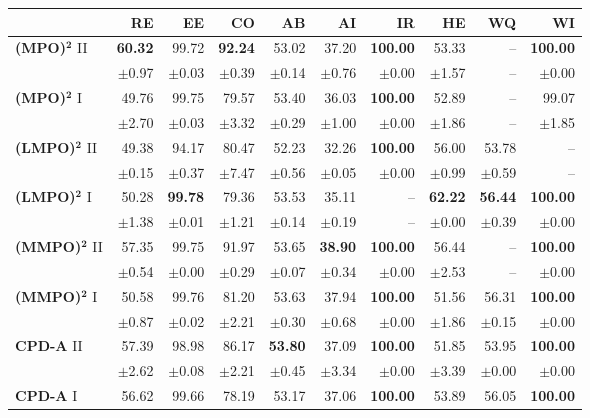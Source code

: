 \begin{table}[!htbp]
\centering
\scriptsize
\begin{tabular}{lrrrrr||rrrr}
\toprule
 & RE & EE & CO & AB & AI & IR & HE & WQ & WI \\
\midrule
\textbf{(MPO)}$\bm{^2}$ II & \textbf{60.32} & 99.72 & \textbf{92.24} & 53.02 & 37.20 & \textbf{100.00} & 53.33 & -- & \textbf{100.00} \\
 & $\pm$0.97 & $\pm$0.03 & $\pm$0.39 & $\pm$0.14 & $\pm$0.76 & $\pm$0.00 & $\pm$1.57 & -- & $\pm$0.00 \\
\midrule
\textbf{(MPO)}$\bm{^2}$ I & 49.76 & 99.75 & 79.57 & 53.40 & 36.03 & \textbf{100.00} & 52.89 & -- & 99.07 \\
 & $\pm$2.70 & $\pm$0.03 & $\pm$3.32 & $\pm$0.29 & $\pm$1.00 & $\pm$0.00 & $\pm$1.86 & -- & $\pm$1.85 \\
\midrule
\textbf{(LMPO)}$\bm{^2}$ II & 49.38 & 94.17 & 80.47 & 52.23 & 32.26 & \textbf{100.00} & 56.00 & 53.78 & -- \\
 & $\pm$0.15 & $\pm$0.37 & $\pm$7.47 & $\pm$0.56 & $\pm$0.05 & $\pm$0.00 & $\pm$0.99 & $\pm$0.59 & -- \\
\midrule
\textbf{(LMPO)}$\bm{^2}$ I & 50.28 & \textbf{99.78} & 79.36 & 53.53 & 35.11 & -- & \textbf{62.22} & \textbf{56.44} & \textbf{100.00} \\
 & $\pm$1.38 & $\pm$0.01 & $\pm$1.21 & $\pm$0.14 & $\pm$0.19 & -- & $\pm$0.00 & $\pm$0.39 & $\pm$0.00 \\
\midrule
\textbf{(MMPO)}$\bm{^2}$ II & 57.35 & 99.75 & 91.97 & 53.65 & \textbf{38.90} & \textbf{100.00} & 56.44 & -- & \textbf{100.00} \\
 & $\pm$0.54 & $\pm$0.00 & $\pm$0.29 & $\pm$0.07 & $\pm$0.34 & $\pm$0.00 & $\pm$2.53 & -- & $\pm$0.00 \\
\midrule
\textbf{(MMPO)}$\bm{^2}$ I & 50.58 & 99.76 & 81.20 & 53.63 & 37.94 & \textbf{100.00} & 51.56 & 56.31 & \textbf{100.00} \\
 & $\pm$0.87 & $\pm$0.02 & $\pm$2.21 & $\pm$0.30 & $\pm$0.68 & $\pm$0.00 & $\pm$1.86 & $\pm$0.15 & $\pm$0.00 \\
\midrule
\textbf{CPD-A} II & 57.39 & 98.98 & 86.17 & \textbf{53.80} & 37.09 & \textbf{100.00} & 51.85 & 53.95 & \textbf{100.00} \\
 & $\pm$2.62 & $\pm$0.08 & $\pm$2.21 & $\pm$0.45 & $\pm$3.34 & $\pm$0.00 & $\pm$3.39 & $\pm$0.00 & $\pm$0.00 \\
\midrule
\textbf{CPD-A} I & 56.62 & 99.66 & 78.19 & 53.17 & 37.06 & \textbf{100.00} & 53.89 & 56.05 & \textbf{100.00} \\

\end{tabular}
\end{table}
